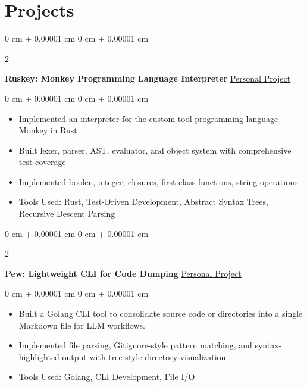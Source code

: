 \documentclass[10pt, letterpaper]{article}
\newenvironment{highlights}{
    \begin{itemize}[
        topsep=0.10 cm,
        parsep=0.10 cm,
        partopsep=0pt,
        itemsep=0pt,
        leftmargin=0 cm + 10pt
    ]
}{
    \end{itemize}
} %
\newenvironment{onecolentry}{
    \begin{adjustwidth}{
        0 cm + 0.00001 cm
    }{
        0 cm + 0.00001 cm
    }
}{
    \end{adjustwidth}
} %
\newenvironment{twocolentry}[2][]{
    \onecolentry
    \def\secondColumn{#2}
    \setcolumnwidth{\fill, 4.5 cm}
    \begin{paracol}{2}
}{
    \switchcolumn \raggedleft \secondColumn
    \end{paracol}
    \endonecolentry
} %
\begin{document}
                \vspace{0.2 cm}
    
        \section{Projects}
        
        \begin{twocolentry}{
            \href{https://github.com/yuann3/Ruskey/}{Personal Project}
        }
            \textbf{Ruskey: Monkey Programming Language Interpreter}\end{twocolentry}

        \vspace{0.10 cm}
        \begin{onecolentry}
            \begin{highlights}
                \item Implemented an interpreter for the custom tool  programming language Monkey in Rust
                \item Built lexer, parser, AST, evaluator, and object system with comprehensive test coverage        
                \item Implemented boolen, integer, closures, first-class functions, string operations
                \item Tools Used: Rust, Test-Driven Development, Abstract Syntax Trees, Recursive Descent Parsing
            \end{highlights}
        \end{onecolentry}


        \vspace{0.2 cm} 

        \begin{twocolentry}{
            \href{https://github.com/yuann3/Pew/}{Personal Project}
        }
            \textbf{Pew: Lightweight CLI for Code Dumping}\end{twocolentry}

        \vspace{0.10 cm}
        \begin{onecolentry}
            \begin{highlights}
                \item Built a Golang CLI tool to consolidate source code or directories into a single Markdown file for LLM workflows.
                \item Implemented file parsing, Gitignore-style pattern matching, and syntax-highlighted output with tree-style directory visualization.
                \item Tools Used: Golang, CLI Development, File I/O
            \end{highlights}
        \end{onecolentry}
\end{document}
